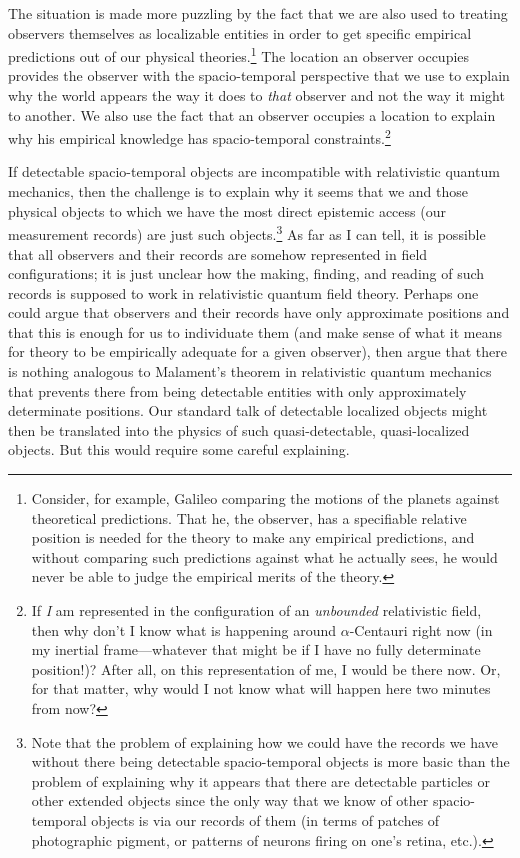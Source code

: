 \documentclass [12pt]{article}
\begin{document}
The situation is made more puzzling by the fact that
we are also used to treating observers themselves as localizable
entities in order to get specific empirical predictions out
of our physical theories.\footnote{Consider,
for example, Galileo comparing the motions of the planets against
theoretical predictions.  That he, the observer, has a
specifiable relative position is needed for the theory
to make any empirical predictions, and without comparing
such predictions against what he actually sees, he would
never be able to judge the empirical merits of
the theory.}  The location an observer occupies provides
the observer with the spacio-temporal perspective that we use to explain why the
world appears the way it does to {\em that\/} observer and not
the way it might to another.  We also use
the fact that an observer occupies a location to explain why
his empirical knowledge has spacio-temporal constraints.\footnote{If
{\em I\/} am represented in the configuration of an {\em unbounded\/} relativistic
field, then why don't I know what is happening around $\alpha$-Centauri
right now (in my inertial frame---whatever that might be if I have no
fully determinate position!)?  After all, on this representation of me, I would be
there now.  Or, for that matter, why would I not
know what will happen here two minutes from now?}

If detectable spacio-temporal objects are incompatible
with relativistic quantum mechanics, then the challenge is to
explain why it seems that we and those physical objects to which we have
the most direct epistemic access (our measurement records) are just
such objects.\footnote{Note that the problem of
explaining how we could have the records we have without there being detectable
spacio-temporal objects is more basic than the problem of explaining why
it appears that there are detectable particles or other extended objects
since the only way that we know of other spacio-temporal
objects is via our records of them (in terms of patches of photographic
pigment, or patterns of neurons firing on one's retina, etc.).}  As far as I
can tell, it is possible that all observers and their records are somehow
represented in field configurations; it is just unclear how the
making, finding, and reading of such records is supposed to work
in relativistic quantum field theory.  Perhaps one could argue that
observers and their records have only approximate
positions and that this is enough for us to individuate them (and make
sense of what it means for theory to be empirically adequate for
a given observer), then argue that there is nothing analogous
to Malament's theorem in relativistic quantum mechanics that prevents
there from being detectable entities with only approximately determinate
positions.  Our standard talk of detectable
localized objects might then be translated into the physics of
such quasi-detectable, quasi-localized objects.  But this would require some
careful explaining.
\end{document}
